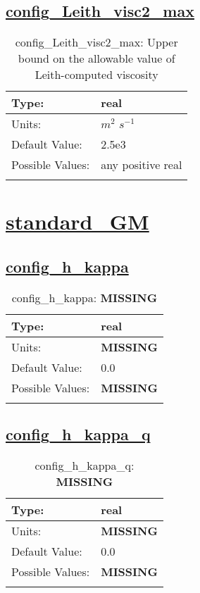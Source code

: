 \subsection[config\_Leith\_visc2\_max]{\hyperref[sec:nm_tab_hmix_Leith]{config\_Leith\_visc2\_max}}
\label{subsec:nm_sec_config_Leith_visc2_max}
\begin{center}
\begin{longtable}{| p{2.0in} | p{4.0in} |}
    \hline
    Type: & real \\
    \hline
    Units: & $m^2$ $s^{-1}$ \\
    \hline
    Default Value: & 2.5e3 \\
    \hline
    Possible Values: & any positive real \\
    \hline
    \caption{config\_Leith\_visc2\_max: Upper bound on the allowable value of Leith-computed viscosity}
\end{longtable}
\end{center}
\section[standard\_GM]{\hyperref[sec:nm_tab_standard_GM]{standard\_GM}}
\label{sec:nm_sec_standard_GM}
\subsection[config\_h\_kappa]{\hyperref[sec:nm_tab_standard_GM]{config\_h\_kappa}}
\label{subsec:nm_sec_config_h_kappa}
\begin{center}
\begin{longtable}{| p{2.0in} | p{4.0in} |}
    \hline
    Type: & real \\
    \hline
    Units: & {\bf \color{red} MISSING} \\
    \hline
    Default Value: & 0.0 \\
    \hline
    Possible Values: & {\bf \color{red} MISSING} \\
    \hline
    \caption{config\_h\_kappa: {\bf \color{red} MISSING}}
\end{longtable}
\end{center}
\subsection[config\_h\_kappa\_q]{\hyperref[sec:nm_tab_standard_GM]{config\_h\_kappa\_q}}
\label{subsec:nm_sec_config_h_kappa_q}
\begin{center}
\begin{longtable}{| p{2.0in} | p{4.0in} |}
    \hline
    Type: & real \\
    \hline
    Units: & {\bf \color{red} MISSING} \\
    \hline
    Default Value: & 0.0 \\
    \hline
    Possible Values: & {\bf \color{red} MISSING} \\
    \hline
    \caption{config\_h\_kappa\_q: {\bf \color{red} MISSING}}
\end{longtable}
\end{center}
